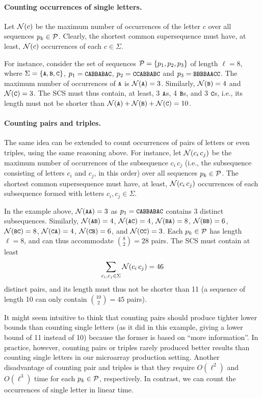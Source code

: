 \paragraph{Counting occurrences of single letters.}
Let ${\mathcal{N}}(c)$ be the maximum number of occurrences of the letter $c$ over all
sequences $p_k \in {\mathcal{P}}$. Clearly, the shortest common supersequence must
have, at least, ${\mathcal{N}}(c)$ occurrences of each $c \in \Sigma$.

For instance, consider the set of sequences ${\mathcal{P}} = \{p_1, p_2, p_3 \}$ of
length $\ell = 8$, where $\Sigma = \{\text{\small{\tt A}},\text{\small{\tt B}},\text{\small{\tt C}} \}$, $p_1 = {\text{\small{\tt{CABBABAC}}}}$,
$p_2 = {\text{\small{\tt{CCABBABC}}}}$ and $p_3 = {\text{\small{\tt{BBBBAACC}}}}$. The maximum number of
occurrences of $\text{\small{\tt A}}$ is ${\mathcal{N}}(\text{\small{\tt A}})=3$. Similarly, ${\mathcal{N}}(\text{\small{\tt B}})=4$ and
${\mathcal{N}}(\text{\small{\tt C}})=3$. The SCS must thus contain, at least, 3 $\text{\small{\tt A}}$s, 4 $\text{\small{\tt B}}$s, and 3
$\text{\small{\tt C}}$s, i.e., its length must not be shorter than
${\mathcal{N}}(\text{\small{\tt A}}) + {\mathcal{N}}(\text{\small{\tt B}}) + {\mathcal{N}}(\text{\small{\tt C}}) = 10$.

\paragraph{Counting pairs and triples.}

The same idea can be extended to count occurrences of pairs of letters or even triples,
using the same reasoning above. For instance, let
${\mathcal{N}}(c_i \, c_j)$ be the maximum number of occurrences of the subsequence
$c_i \, c_j$ (i.e., the subsequence consisting of letters $c_i$ and $c_j$, in
this order) over all sequences $p_k \in {\mathcal{P}}$. The shortest common
supersequence must have, at least, ${\mathcal{N}}(c_i \, c_j)$ occurrences of each
subsequence formed with letters $c_i, c_j \in \Sigma$.

In the example above, ${\mathcal{N}}({\text{\small{\tt{AA}}}}) = 3$ as $p_1 = {\text{\small{\tt{CABBABAC}}}}$ contains 3
distinct  subsequences. Similarly, ${\mathcal{N}}({\text{\small{\tt{AB}}}}) = 4$,
${\mathcal{N}}({\text{\small{\tt{AC}}}}) = 4$, ${\mathcal{N}}({\text{\small{\tt{BA}}}}) = 8$, ${\mathcal{N}}({\text{\small{\tt{BB}}}}) = 6$,
${\mathcal{N}}({\text{\small{\tt{BC}}}}) = 8$, ${\mathcal{N}}({\text{\small{\tt{CA}}}}) = 4$, ${\mathcal{N}}({\text{\small{\tt{CB}}}}) = 6$, and
${\mathcal{N}}({\text{\small{\tt{CC}}}}) = 3$. Each $p_k \in {\mathcal{P}}$ has length $\ell = 8$,
and can thus accommodate ${8 \choose 2} = 28$ pairs. The SCS must contain
at least
\[
\sum_{c_i, c_j \in \Sigma} {\mathcal{N}}(c_i \, c_j) = 46
\]
distinct pairs, and its length must thus not be shorter than 11 (a sequence of
length 10 can only contain ${10 \choose 2} = 45$ pairs).

It might seem intuitive to think that counting pairs should produce tighter
lower bounds than counting single letters (as it did in this example, giving a
lower bound of 11 instead of 10) because the former is based on ``more
information''. In practice, however, counting pairs or triples rarely produced
better results than counting single letters in our microarray production
setting. Another disadvantage of counting pair and triples is that they require
$O(\ell^2)$ and $O(\ell^3)$ time for each $p_k \in {\mathcal{P}}$, respectively. In
contrast, we can count the occurrences of single letter in linear time.

